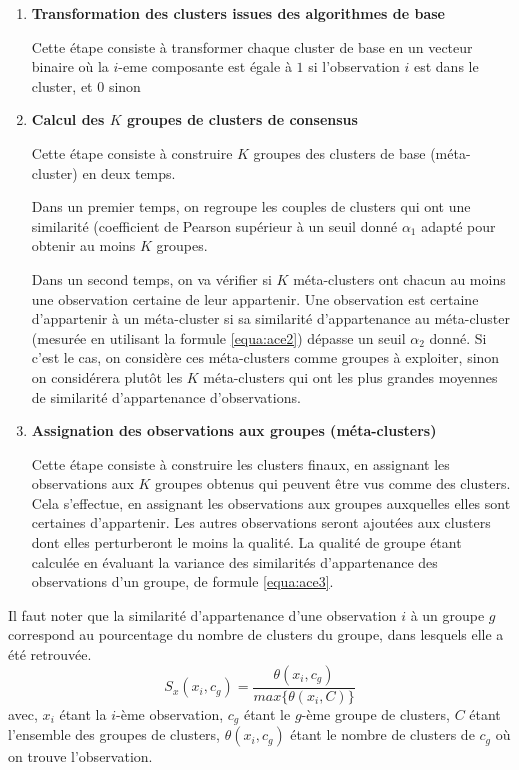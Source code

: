     	   \begin{enumerate}
     		   \item \textbf{Transformation des clusters issues des algorithmes de base}
			 
     		   Cette étape consiste à transformer chaque cluster de base en un vecteur binaire où la $i$-eme composante est égale à $1$ si l'observation $i$ est dans le cluster, et $0$ sinon
			 
     		   \item \textbf{Calcul des $K$ groupes de clusters de consensus}
			 
     		   Cette étape consiste à construire $K$ groupes des clusters de base (méta-cluster) en deux temps.
			 
     		   Dans un premier temps, on regroupe les couples de clusters qui ont une similarité (coefficient de Pearson %
               supérieur à un seuil donné $\alpha_1$ adapté pour obtenir au moins $K$ groupes.
  	 
     		  Dans un second temps, on va vérifier si $K$ méta-clusters ont chacun au moins une observation certaine de leur appartenir.
    		 Une observation est certaine d'appartenir à un méta-cluster si sa similarité d'appartenance au méta-cluster (mesurée en utilisant la formule \ref{equa:ace2}) dépasse un seuil $\alpha_2$ donné.
     		   Si c'est le cas, on considère ces méta-clusters comme groupes à exploiter, sinon on considérera plutôt les $K$ méta-clusters qui ont les plus grandes moyennes de similarité d'appartenance d'observations.
			 
     		   \item \textbf{Assignation des observations aux groupes (méta-clusters)}
			 
     		   Cette étape consiste à construire les clusters finaux, en assignant les observations aux $K$ groupes obtenus qui peuvent être vus comme des clusters.
     		   Cela s'effectue, en assignant les observations aux groupes auxquelles elles sont certaines d'appartenir.
     		   Les autres observations seront ajoutées aux clusters dont elles perturberont le moins la qualité.
     		   La qualité de groupe étant calculée en évaluant la variance des similarités d'appartenance des observations d'un groupe, de formule \ref{equa:ace3}.
			 
     	   \end{enumerate}
      
     	   Il faut noter que la similarité d'appartenance d'une observation $i$ à un groupe $g$ correspond au pourcentage du nombre de clusters du groupe, dans lesquels elle a été retrouvée.
     	   \begin{equation}
     		   S_x(x_i,c_g) = \frac{\theta(x_i, c_g)}{ max\{ \theta(x_i, C) \} }
     		   \label{equa:ace2}
     	   \end{equation}
     	   avec, $x_i$ étant la $i$-ème observation, $c_g$ étant le $g$-ème groupe de clusters, $C$ étant l'ensemble des groupes de clusters, $\theta(x_i, c_g)$ étant le nombre de clusters de $c_g$ où on trouve l'observation.
      
